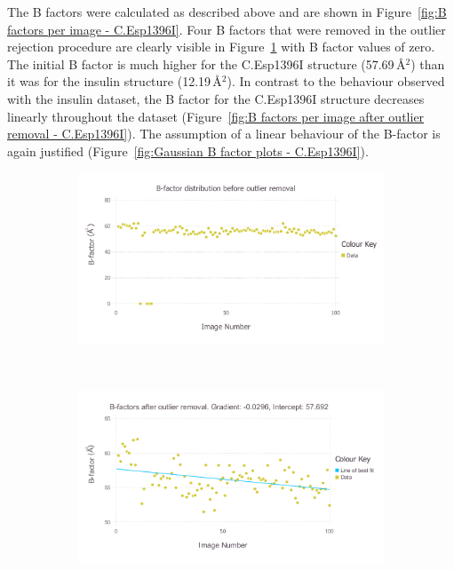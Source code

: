 The B factors were calculated as described above and are shown in Figure~\ref{fig:B factors per image - C.Esp1396I}.
Four B factors that were removed in the outlier rejection procedure are clearly visible in Figure~\ref{fig:B factors per image before outlier removal - C.Esp1396I} with B factor values of zero.
The initial B factor is much higher for the C.Esp1396I structure (57.69$\,$\AA$^2$) than it was for the insulin structure (12.19$\,$\AA$^2$).
In contrast to the behaviour observed with the insulin dataset, the B factor for the C.Esp1396I structure decreases linearly throughout the dataset (Figure~\ref{fig:B factors per image after outlier removal - C.Esp1396I}).
The assumption of a linear behaviour of the B-factor is again justified (Figure~\ref{fig:Gaussian B factor plots - C.Esp1396I}).
\begin{figure}
    \centering
    \begin{subfigure}[b]{1.0\textwidth}
            \centering
            \includegraphics[width=\textwidth]{figures/datared/BFac_Plot_Before_outlier_removal_cprot.pdf}
            \caption{}
            \label{fig:B factors per image before outlier removal - C.Esp1396I}
    \end{subfigure}
    \\
    \begin{subfigure}[b]{1.0\textwidth}
            \centering
            \includegraphics[width=\textwidth]{figures/datared/BFac_Plot_After_outlier_removal_cprot.pdf}

\end{subfigure}
\end{figure}

